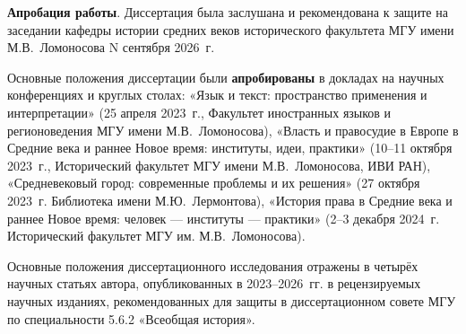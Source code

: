 \textbf{А}\textbf{пробация работы}. Диссертация была заслушана и рекомендована к защите на заседании кафедры истории средних веков исторического факультета МГУ имени М.В.~Ломоносова N сентября 2026~г.

Основные положения диссертации были \textbf{апробированы} в докладах на научных конференциях и круглых столах: «Язык и текст: пространство применения и интерпретации» (25 апреля 2023~г., Факультет иностранных языков и регионоведения МГУ имени М.В.~Ломоносова), «Власть и правосудие в Европе в Средние века и раннее Новое время: институты, идеи, практики» (10--11 октября 2023~г., Исторический факультет МГУ имени М.В.~Ломоносова, ИВИ РАН), «Средневековый город: современные проблемы и их решения» (27 октября 2023~г. Библиотека имени М.Ю.~Лермонтова), «История права в Средние века и раннее Новое время: человек --- институты --- практики» (2--3 декабря 2024~г. Исторический факультет МГУ им. М.В.~Ломоносова).

Основные положения диссертационного исследования отражены в четырёх научных статьях автора, опубликованных в 2023--2026~гг. в рецензируемых научных изданиях, рекомендованных для защиты в диссертационном совете МГУ по специальности 5.6.2 «Всеобщая история».
